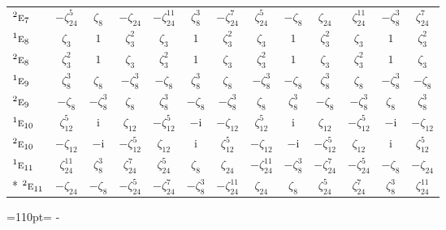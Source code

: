 \documentclass[10pt,a4paper]{article}
\newcommand{\needspace}[1]{\par\penalty-100\begingroup\dimen0=#1\relax\dimen2=\pagegoal
  \advance\dimen2-\pagetotal\ifdim\dimen0>\dimen2\relax\ifdim\dimen2>0pt\vfil\break\fi\fi
  \endgroup}
\numberwithin{equation}{section}
\newcommand{\irr}[1]{\text{\normalfont\scshape #1}}
\newcommand{\conjpair}[1]{{}^{#1}}
\newcommand{\iunit}{\mathrm{i}}
\newcommand{\rootunity}[1]{\zeta_{#1}}
\begin{document}
{\begin{longtable}{@{}lcccccccccccc@{}}
$\conjpair{2}\irr{e}_{7}$ & $-\rootunity{24}^{5}$ & $\rootunity{8}$ & $-\rootunity{24}$ & $-\rootunity{24}^{11}$ & $\rootunity{8}^{3}$ & $-\rootunity{24}^{7}$ & $\rootunity{24}^{5}$ & $-\rootunity{8}$ & $\rootunity{24}$ & $\rootunity{24}^{11}$ & $-\rootunity{8}^{3}$ & $\rootunity{24}^{7}$\\
$\conjpair{1}\irr{e}_{8}$ & $\rootunity{3}$ & $1$ & $\rootunity{3}^{2}$ & $\rootunity{3}$ & $1$ & $\rootunity{3}^{2}$ & $\rootunity{3}$ & $1$ & $\rootunity{3}^{2}$ & $\rootunity{3}$ & $1$ & $\rootunity{3}^{2}$\\
$\conjpair{2}\irr{e}_{8}$ & $\rootunity{3}^{2}$ & $1$ & $\rootunity{3}$ & $\rootunity{3}^{2}$ & $1$ & $\rootunity{3}$ & $\rootunity{3}^{2}$ & $1$ & $\rootunity{3}$ & $\rootunity{3}^{2}$ & $1$ & $\rootunity{3}$\\
$\conjpair{1}\irr{e}_{9}$ & $\rootunity{8}^{3}$ & $\rootunity{8}$ & $-\rootunity{8}^{3}$ & $-\rootunity{8}$ & $\rootunity{8}^{3}$ & $\rootunity{8}$ & $-\rootunity{8}^{3}$ & $-\rootunity{8}$ & $\rootunity{8}^{3}$ & $\rootunity{8}$ & $-\rootunity{8}^{3}$ & $-\rootunity{8}$\\
$\conjpair{2}\irr{e}_{9}$ & $-\rootunity{8}$ & $-\rootunity{8}^{3}$ & $\rootunity{8}$ & $\rootunity{8}^{3}$ & $-\rootunity{8}$ & $-\rootunity{8}^{3}$ & $\rootunity{8}$ & $\rootunity{8}^{3}$ & $-\rootunity{8}$ & $-\rootunity{8}^{3}$ & $\rootunity{8}$ & $\rootunity{8}^{3}$\\
$\conjpair{1}\irr{e}_{10}$ & $\rootunity{12}^{5}$ & $\iunit{}$ & $\rootunity{12}$ & $-\rootunity{12}^{5}$ & $-\iunit{}$ & $-\rootunity{12}$ & $\rootunity{12}^{5}$ & $\iunit{}$ & $\rootunity{12}$ & $-\rootunity{12}^{5}$ & $-\iunit{}$ & $-\rootunity{12}$\\
$\conjpair{2}\irr{e}_{10}$ & $-\rootunity{12}$ & $-\iunit{}$ & $-\rootunity{12}^{5}$ & $\rootunity{12}$ & $\iunit{}$ & $\rootunity{12}^{5}$ & $-\rootunity{12}$ & $-\iunit{}$ & $-\rootunity{12}^{5}$ & $\rootunity{12}$ & $\iunit{}$ & $\rootunity{12}^{5}$\\
$\conjpair{1}\irr{e}_{11}$ & $\rootunity{24}^{11}$ & $\rootunity{8}^{3}$ & $\rootunity{24}^{7}$ & $\rootunity{24}^{5}$ & $\rootunity{8}$ & $\rootunity{24}$ & $-\rootunity{24}^{11}$ & $-\rootunity{8}^{3}$ & $-\rootunity{24}^{7}$ & $-\rootunity{24}^{5}$ & $-\rootunity{8}$ & $-\rootunity{24}$\\*
$\conjpair{2}\irr{e}_{11}$ & $-\rootunity{24}$ & $-\rootunity{8}$ & $-\rootunity{24}^{5}$ & $-\rootunity{24}^{7}$ & $-\rootunity{8}^{3}$ & $-\rootunity{24}^{11}$ & $\rootunity{24}$ & $\rootunity{8}$ & $\rootunity{24}^{5}$ & $\rootunity{24}^{7}$ & $\rootunity{8}^{3}$ & $\rootunity{24}^{11}$\\
\bottomrule\end{longtable}}
\needspace{110pt}
\end{document}
